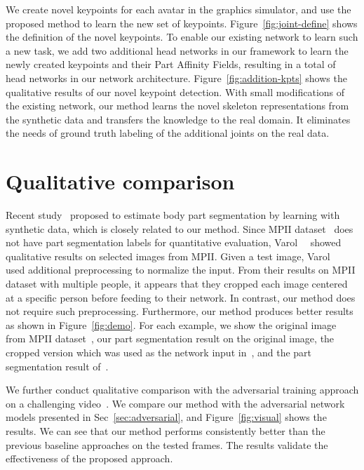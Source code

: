 \documentclass[final]{IEEEtran}
\begin{document}
{\begin{minipage}{\textwidth}
We create  novel keypoints for each avatar in the graphics simulator, and use the proposed method to learn the new set of keypoints. Figure~\ref{fig:joint-define} shows the definition of the novel keypoints. To enable our existing network to learn such a new task, we add two additional head networks in our framework to learn the newly created  keypoints and their Part Affinity Fields, resulting in a total of  head networks in our network architecture. Figure~\ref{fig:addition-kpts} shows the qualitative results of our novel keypoint detection.
With small modifications of the existing network, our method learns the novel skeleton representations from the synthetic data and transfers the knowledge to the real domain. It eliminates the needs of ground truth labeling of the additional joints on the real data. 



\section{Qualitative comparison}
Recent study~\cite{varol2017learning} proposed to estimate body part segmentation by learning with synthetic data, which is closely related to our method. 
Since MPII dataset~\cite{andriluka20142d} does not have part segmentation labels for quantitative evaluation, Varol~\etal~\cite{varol2017learning} showed qualitative results on selected images from MPII. 
Given a test image, Varol~\etal~\cite{varol2017learning} used additional preprocessing to normalize the input. From their results on MPII dataset with multiple people, it appears that they cropped each image centered at a specific person before feeding to their network. In contrast, our method does not require such preprocessing. Furthermore, our method produces better results as shown in Figure~\ref{fig:demo}. For each example, we show the original image from MPII dataset~\cite{andriluka20142d}, our part segmentation result on the original image, the cropped version which was used as the network input in~\cite{varol2017learning}, and the part segmentation result of~\cite{varol2017learning}.

We further conduct qualitative comparison with the adversarial training approach on a challenging video~\cite{youtube-video}. We compare our method with the adversarial network models presented in Sec~\ref{sec:adversarial}, and Figure~\ref{fig:visual} shows the results. We can see that our method performs consistently better than the previous baseline approaches on the tested frames. The results validate the effectiveness of the proposed approach.

\end{minipage}}
\end{document}

